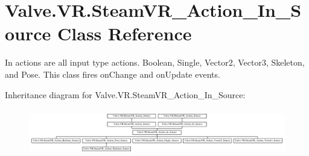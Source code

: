 \hypertarget{class_valve_1_1_v_r_1_1_steam_v_r___action___in___source}{}\section{Valve.\+V\+R.\+Steam\+V\+R\+\_\+\+Action\+\_\+\+In\+\_\+\+Source Class Reference}
\label{class_valve_1_1_v_r_1_1_steam_v_r___action___in___source}


In actions are all input type actions. Boolean, Single, Vector2, Vector3, Skeleton, and Pose. This class fires on\+Change and on\+Update events.  


Inheritance diagram for Valve.\+V\+R.\+Steam\+V\+R\+\_\+\+Action\+\_\+\+In\+\_\+\+Source\+:\begin{figure}[H]
\begin{center}
\leavevmode
\includegraphics[height=2.036364cm]{class_valve_1_1_v_r_1_1_steam_v_r___action___in___source}
\end{center}
\end{figure}

